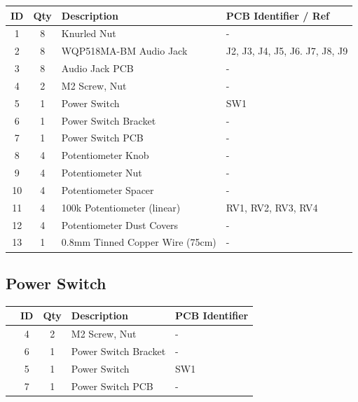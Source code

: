\documentclass[12pt, a4paper]{article}
\newcommand{\checkbox}[1]{\CheckBox[backgroundcolor=0.86 0.828 0.71, name=#1]{}}
\begin{document}
\begin{center}
    \small
    \setlength\extrarowheight{4pt}
    \begin{tabularx}{\textwidth}{|c|c|X|l|}
        \hline \rowcolor{lightgray} ID & Qty & Description & PCB Identifier / Ref\\
        \hline  1 & 8 & Knurled Nut & -\\
        \hline  2 & 8 & WQP518MA-BM Audio Jack & J2, J3, J4, J5, J6. J7, J8, J9\\
        \hline  3 & 8 & Audio Jack PCB & -\\
        \hline  4 & 2 & M2 Screw, Nut & -\\
        \hline  5 & 1 & Power Switch & SW1\\
        \hline  6 & 1 & Power Switch Bracket & -\\
        \hline  7 & 1 & Power Switch PCB & -\\
        \hline  8 & 4 & Potentiometer Knob & -\\
        \hline  9 & 4 & Potentiometer Nut & -\\
        \hline 10 & 4 & Potentiometer Spacer & -\\
        \hline 11 & 4 & 100k Potentiometer (linear) & RV1, RV2, RV3, RV4\\
        \hline 12 & 4 & Potentiometer Dust Covers & -\\
        \hline 13 & 1 & 0.8mm Tinned Copper Wire (75cm) & -\\
        \hline
    \end{tabularx}
\end{center}

\pagebreak
\subsection{Power Switch}

\begin{center}
    \small
    \setlength\extrarowheight{8pt}
    \begin{tabularx}{\textwidth}{|c|c|c|X|l|}
        \hline\rowcolor{lightgray} & ID & Qty & Description & PCB Identifier\\
        \hline\checkbox{ha} & 4 & 2 & M2 Screw, Nut & -\\
        \hline\checkbox{hb} & 6 & 1 & Power Switch Bracket & -\\
        \hline\checkbox{hc} & 5 & 1 & Power Switch & SW1\\
        \hline\checkbox{hd} & 7 & 1 & Power Switch PCB & -\\
        \hline
    \end{tabularx}
\end{center}
\end{document}
